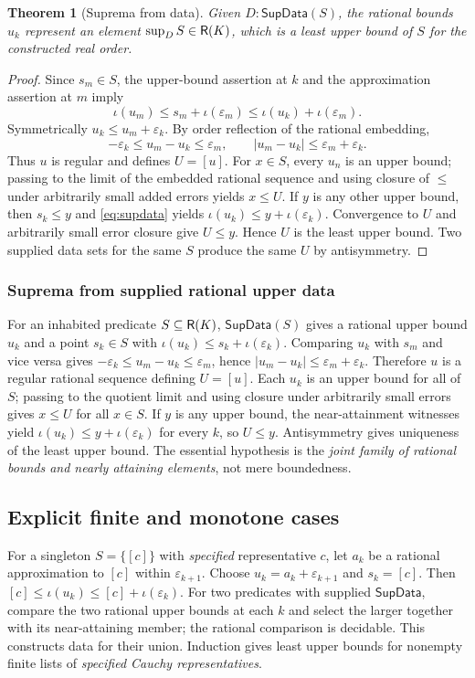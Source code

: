 \documentclass[11pt,reqno]{amsart}
\newtheorem{theorem}{Theorem}[section]
\theoremstyle{definition}\newtheorem{definition}[theorem]{Definition}
\theoremstyle{remark}\newtheorem{remark}[theorem]{Remark}
\newcommand{\eps}{\varepsilon}
\begin{document}
\begin{theorem}[Suprema from data]\label{thm:sup}
Given $D:\mathsf{SupData}(S)$, the rational bounds $u_k$ represent an element $\sup_D S\in\mathsf R(K)$, which is a least upper bound of $S$ for the constructed real order.
\end{theorem}
\begin{proof}
Since $s_m\in S$, the upper-bound assertion at $k$ and the approximation assertion at $m$ imply
\[\iota(u_m)\le s_m+\iota(\eps_m)\le\iota(u_k)+\iota(\eps_m).
\]
Symmetrically $u_k\le u_m+\eps_k$. By order reflection of the rational embedding,
\[-\eps_k\le u_m-u_k\le\eps_m,\qquad |u_m-u_k|\le\eps_m+\eps_k.
\]
Thus $u$ is regular and defines $U=[u]$. For $x\in S$, every $u_n$ is an upper bound; passing to the limit of the embedded rational sequence and using closure of $\le$ under arbitrarily small added errors yields $x\le U$. If $y$ is any other upper bound, then $s_k\le y$ and \eqref{eq:supdata} yields $\iota(u_k)\le y+\iota(\eps_k)$. Convergence to $U$ and arbitrarily small error closure give $U\le y$. Hence $U$ is the least upper bound. Two supplied data sets for the same $S$ produce the same $U$ by antisymmetry.
\end{proof}


\medskip
\subsubsection*{Suprema from supplied rational upper data}\label{supp:13-6}
For an inhabited predicate $S\subseteq\mathsf R(K)$, $\mathsf{SupData}(S)$ gives a rational upper bound $u_k$ and a point $s_k\in S$ with $\iota(u_k)\le s_k+\iota(\eps_k)$. Comparing $u_k$ with $s_m$ and vice versa gives $-\eps_k\le u_m-u_k\le\eps_m$, hence $|u_m-u_k|\le\eps_m+\eps_k$. Therefore $u$ is a regular rational sequence defining $U=[u]$. Each $u_k$ is an upper bound for all of $S$; passing to the quotient limit and using closure under arbitrarily small errors gives $x\le U$ for all $x\in S$. If $y$ is any upper bound, the near-attainment witnesses yield $\iota(u_k)\le y+\iota(\eps_k)$ for every $k$, so $U\le y$. Antisymmetry gives uniqueness of the least upper bound. The essential hypothesis is the \emph{joint family of rational bounds and nearly attaining elements}, not mere boundedness.
\medskip

\subsection{Explicit finite and monotone cases}\label{main:sub-51}
For a singleton $S=\{[c]\}$ with \emph{specified} representative $c$, let $a_k$ be a rational approximation to $[c]$ within $\eps_{k+1}$. Choose $u_k=a_k+\eps_{k+1}$ and $s_k=[c]$. Then $[c]\le\iota(u_k)\le[c]+\iota(\eps_k)$. For two predicates with supplied $\mathsf{SupData}$, compare the two rational upper bounds at each $k$ and select the larger together with its near-attaining member; the rational comparison is decidable. This constructs data for their union. Induction gives least upper bounds for nonempty finite lists of \emph{specified Cauchy representatives}.
\end{document}
